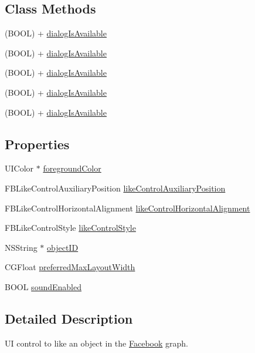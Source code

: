 \subsection*{Class Methods}
\begin{DoxyCompactItemize}
\item 
(B\+O\+OL) + \hyperlink{interfaceFBLikeControl_a31182182d8e02669ba4bc6cec96e9111}{dialog\+Is\+Available}
\item 
(B\+O\+OL) + \hyperlink{interfaceFBLikeControl_a31182182d8e02669ba4bc6cec96e9111}{dialog\+Is\+Available}
\item 
(B\+O\+OL) + \hyperlink{interfaceFBLikeControl_a31182182d8e02669ba4bc6cec96e9111}{dialog\+Is\+Available}
\item 
(B\+O\+OL) + \hyperlink{interfaceFBLikeControl_a31182182d8e02669ba4bc6cec96e9111}{dialog\+Is\+Available}
\item 
(B\+O\+OL) + \hyperlink{interfaceFBLikeControl_a31182182d8e02669ba4bc6cec96e9111}{dialog\+Is\+Available}
\end{DoxyCompactItemize}
\subsection*{Properties}
\begin{DoxyCompactItemize}
\item 
U\+I\+Color $\ast$ \hyperlink{interfaceFBLikeControl_a8c6fc0940bee39d9838e8ed10225975e}{foreground\+Color}
\item 
F\+B\+Like\+Control\+Auxiliary\+Position \hyperlink{interfaceFBLikeControl_a65c29f2c40041e2c0cc373edc79a8c9e}{like\+Control\+Auxiliary\+Position}
\item 
F\+B\+Like\+Control\+Horizontal\+Alignment \hyperlink{interfaceFBLikeControl_a5ff124a8db638f033ac760e694fcd2b7}{like\+Control\+Horizontal\+Alignment}
\item 
F\+B\+Like\+Control\+Style \hyperlink{interfaceFBLikeControl_aa0122a09a145e1246d49a5ec0da4e42e}{like\+Control\+Style}
\item 
N\+S\+String $\ast$ \hyperlink{interfaceFBLikeControl_ad46d4cb5a5d5985e89a09193a8499ffd}{object\+ID}
\item 
C\+G\+Float \hyperlink{interfaceFBLikeControl_a34871f0ad32d03df9f3659962a01c8c1}{preferred\+Max\+Layout\+Width}
\item 
B\+O\+OL \hyperlink{interfaceFBLikeControl_aedeec4cc63d942105aeae5ce24bd877d}{sound\+Enabled}
\end{DoxyCompactItemize}


\subsection{Detailed Description}
UI control to like an object in the \hyperlink{interfaceFacebook}{Facebook} graph.

